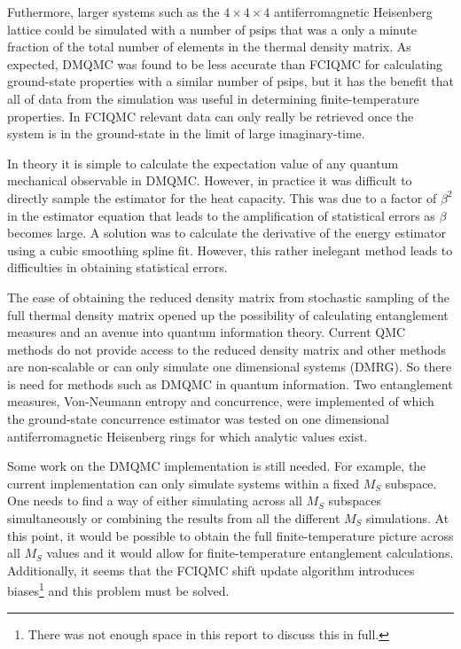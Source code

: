 Futhermore, larger systems such as the $4\times4\times4$ antiferromagnetic Heisenberg lattice could be simulated with a number of psips that was a only a minute fraction of the total number of elements in the thermal density matrix. As expected, DMQMC was found to be less accurate than FCIQMC for calculating ground-state properties with a similar number of psips, but it has the benefit that all of data from the simulation was useful in determining finite-temperature properties. In FCIQMC relevant data can only really be retrieved once the system is in the ground-state in the limit of large imaginary-time.

In theory it is simple to calculate the expectation value of any quantum mechanical observable in DMQMC. However, in practice it was difficult to directly sample the estimator for the heat capacity. This was due to a factor of $\beta^2$ in the estimator equation that leads to the amplification of statistical errors as $\beta$ becomes large. A solution was to calculate the derivative of the energy estimator using a cubic smoothing spline fit. However, this rather inelegant method leads to difficulties in obtaining statistical errors.

The ease of obtaining the reduced density matrix from stochastic sampling of the full thermal density matrix opened up the possibility of calculating entanglement measures and an avenue into quantum information theory. Current QMC methods do not provide access to the reduced density matrix and other methods  are non-scalable or can only simulate one dimensional systems (DMRG). So there is need for methods such as DMQMC in quantum information. Two entanglement measures, Von-Neumann entropy and concurrence, were implemented of which the ground-state concurrence estimator was tested on one dimensional antiferromagnetic Heisenberg rings for which analytic values exist. 

Some work on the DMQMC implementation is still needed. For example, the current implementation can only simulate systems within a fixed $M_S$ subspace. One needs to find a way of either simulating across all $M_S$ subspaces simultaneously or combining the results from all the different $M_S$ simulations. At this point, it would be possible to obtain the full finite-temperature picture across all $M_S$ values and it would allow for finite-temperature entanglement calculations. Additionally, it seems that the FCIQMC shift update algorithm introduces biases\footnote{There was not enough space in this report to discuss this in full.} and this problem must be solved.

